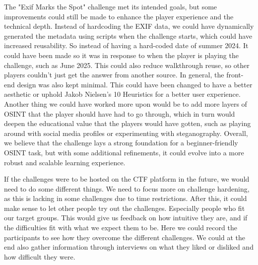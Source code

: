 The "Exif Marks the Spot" challenge met its intended goals, but some improvements could still be made to enhance the player experience and the technical depth.
Instead of hardcoding the EXIF data, we could have dynamically generated the metadata using scripts when the challenge starts, which could have increased reusability. So instead of having a hard-coded date of summer 2024. It could have been made so it was in response to when the player is playing the challenge, such as June 2025. This could also reduce walkthrough reuse, so other players couldn't just get the answer from another source.
In general, the front-end design was also kept minimal. This could have been changed to have a better aesthetic or uphold Jakob Nielsen's 10 Heuristics\cite{JakobNielsen10Heuristic} for a better user experience.
Another thing we could have worked more upon would be to add more layers of OSINT that the player should have had to go through, which in turn would deepen the educational value that the players would have gotten, such as playing around with social media profiles or experimenting with steganography.
Overall, we believe that the challenge lays a strong foundation for a beginner-friendly OSINT task, but with some additional refinements, it could evolve into a more robust and scalable learning experience. 


If the challenges were to be hosted on the CTF platform in the future, we would need to do some different things. We need to focus more on challenge hardening, as this is lacking in some challenges due to time restrictions. After this, it could make sense to let other people try out the challenges. Especially people who fit our target groups. This would give us feedback on how intuitive they are, and if the difficulties fit with what we expect them to be. Here we could record the participants to see how they overcome the different challenges. We could at the end also gather information through interviews on what they liked or disliked and how difficult they were.
